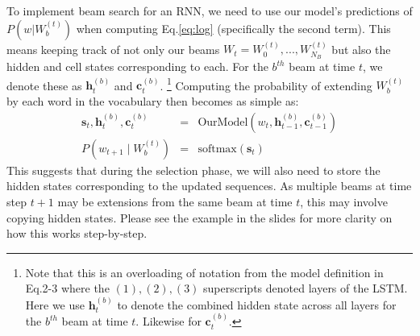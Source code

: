 \documentclass[a4paper,10pt]{article}
\begin{document}
 To implement beam search for an RNN, we need to use our model's predictions of $P(w | W_b^{(t)})$ when computing Eq.\ref{eq:log} (specifically the second term). This means keeping track of not only our beams $W_t= W_0^{(t)}, ..., W_{N_B}^{(t)}$ but also the hidden and cell states corresponding to each. For the $b^{th}$ beam at time $t$, we denote these as $\mathbf{h}_t^{(b)}$ and $\mathbf{c}_t^{(b)}$. \footnote{Note that this is an overloading of notation from the model definition in Eq.2-3 where the $(1), (2), (3)$ superscripts denoted layers of the LSTM. Here we use $\mathbf{h}_t^{(b)}$ to denote the combined hidden state across all layers for the $b^{th}$ beam at time $t$. Likewise for $\mathbf{c}_t^{(b)}$.} Computing the probability of extending $W_b^{(t)}$ by each word in the vocabulary then becomes as simple as: 
%
\begin{eqnarray}
\mathbf{s}_t, \mathbf{h}_{t}^{(b)}, \mathbf{c}_{t}^{(b)} &=& \mbox{OurModel}\left(w_{t}, \mathbf{h}_{t-1}^{(b)}, \mathbf{c}_{t-1}^{(b)}\right)\\
P(w_{t+1} \mid W_b^{(t)}) &=& \mbox{softmax}(\mathbf{s}_t)
\end{eqnarray}
%
This suggests that during the selection phase, we will also need to store the hidden states corresponding to the updated sequences. As multiple beams at time step $t+1$ may be extensions from the same beam at time $t$, this may involve copying hidden states. Please see the example in the slides for more clarity on how this works step-by-step. 
\end{document}
